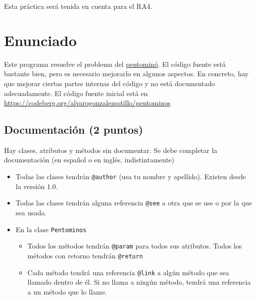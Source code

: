 \documentclass[a4paper]{article}
\begin{document}
Esta práctica será tenida en cuenta para el RA4.
\section{Enunciado}
\label{sec:org000000f}
Este programa resuelve el problema del \href{http://es.wikipedia.org/wiki/Pentomin\%C3\%B3}{pentominó}. El código fuente está bastante bien, pero es necesario mejorarlo en algunos aspectos. En concreto, hay que mejorar ciertas partes internas del código y no está documentado adecuadamente. El código fuente inicial está en \url{https://codeberg.org/alvarogonzalezsotillo/pentominos}
\subsection{Documentación (2 puntos)}
\label{sec:org0000003}
Hay clases, atributos y métodos sin documentar. Se debe completar la documentación (en español o en inglés, indistintamente)

\begin{itemize}
\item Todas las clases tendrán \texttt{@author} (usa tu nombre y apellido). Existen desde la versión 1.0.
\item Todas las clases tendrán alguna referencia \texttt{@see} a otra que se use o por la que sea usada.
\item En la clase \texttt{Pentominos}  
\begin{itemize}
\item Todos los métodos tendrán \texttt{@param} para todos sus atributos. Todos los métodos con retorno tendrán \texttt{@return}
\item Cada método tendrá una referencia \texttt{@link} a algún método que sea llamado dentro de él. Si no llama a ningún método, tendrá una referencia a un método que lo llame.
\end{itemize}
\end{itemize}
\end{document}

